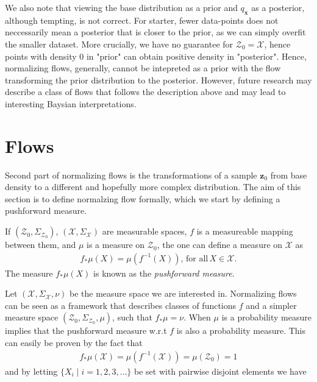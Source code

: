 We also note that viewing the base distribution as a prior and \(q_{\bm{x}}\) as a
posterior, although tempting, is not correct. For starter, fewer data-points does
not neccessarily mean a posterior that is closer to the prior, as we can 
simply overfit the smaller dataset. More crucially, we have no guarantee for
\(\mathcal{Z}_0 = \mathcal{X}\), hence points with density 0 in "prior" can obtain
positive density in "posterior". Hence, normalizing flows, generally, cannot be 
intepreted as a prior with the flow transforming the prior distribution to the posterior.
However, future research may describe a class of flows that follows the description
above and may lead to interesting Baysian interpretations.

\section{Flows}
Second part of normalizing flows is the transformations of a 
sample \(\bm{z}_0\) from base density to a different and hopefully more complex distribution.
The aim of this section is to define normalzing flow formally, which we start by
defining a pushforward measure.
\begin{definition}  
    If \((\mathcal{Z}_0,\Sigma_{\mathcal{Z}_0})\), \((\mathcal{X}, \Sigma_{\mathcal{X}})\)
    are measurable spaces, \(f\) is a measureable mapping between them, and 
    \(\mu\) is a measure on \(\mathcal{Z}_0\), the one can define a measure on 
    \(\mathcal{X}\) as
    \begin{align}
        f_{*}\mu(X) = \mu\left(f^{-1}(X)\right), \, \text{for all} \, X\in \mathcal{X}.
    \end{align}
    The measure \(f_* \mu(X)\) is known as the \textit{pushforward measure}.
\end{definition}
Let \((\mathcal{X}, \Sigma_{\mathcal{X}}, \nu)\) be the measure space we
are interested in. Normalizing flows can be seen as a framework that describes
classes of functions \(f\) and a simpler measure space 
\((\mathcal{Z}_0, \Sigma_{\mathcal{Z}_0}, \mu)\), such that \(f_* \mu = \nu\).
When \(\mu\) is a probability measure implies that the pushforward measure w.r.t
\(f\) is also a probability measure. This can easily be proven by the 
fact that 
\begin{align*}
    f_*\mu(\mathcal{X}) = \mu\left(f^{-1}(\mathcal{X})\right)
    = \mu(\mathcal{Z}_0) = 1 
\end{align*}
and by letting \(\{X_i\mid i = 1,2,3,\dots\}\) be set with pairwise disjoint elements we have 
